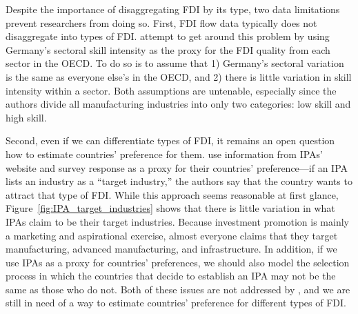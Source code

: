 Despite the importance of disaggregating FDI by its type, two data limitations
prevent researchers from doing so. First, FDI flow data typically does not
disaggregate into types of FDI. \citet{Alfaro2007} attempt to get around this
problem by using Germany's sectoral skill intensity as the proxy for the FDI
quality from each sector in the OECD. To do so is to assume that 1) Germany's
sectoral variation is the same as everyone else's in the OECD, and 2) there is
little variation in skill intensity within a sector. Both assumptions are
untenable, especially since the authors divide all manufacturing industries into
only two categories: low skill and high skill.

Second, even if we can differentiate types of FDI, it remains an open question
how to estimate countries' preference for them. \citet{Alfaro2007} use
information from IPAs' website and survey response as a proxy for their
countries' preference---if an IPA lists an industry as a ``target industry,''
the authors say that the country wants to attract that type of FDI. While this
approach seems reasonable at first glance,
Figure~\ref{fig:IPA_target_industries} shows that there is little variation in
what IPAs claim to be their target industries. Because investment promotion is
mainly a marketing and aspirational exercise, almost everyone claims that they
target manufacturing, advanced manufacturing, and infrastructure. In addition,
if we use IPAs as a proxy for countries' preferences, we should also model the
selection process in which the countries that decide to establish an IPA may not
be the same as those who do not. Both of these issues are not addressed by
\citet{Alfaro2007}, and we are still in need of a way to estimate countries'
preference for different types of FDI.

